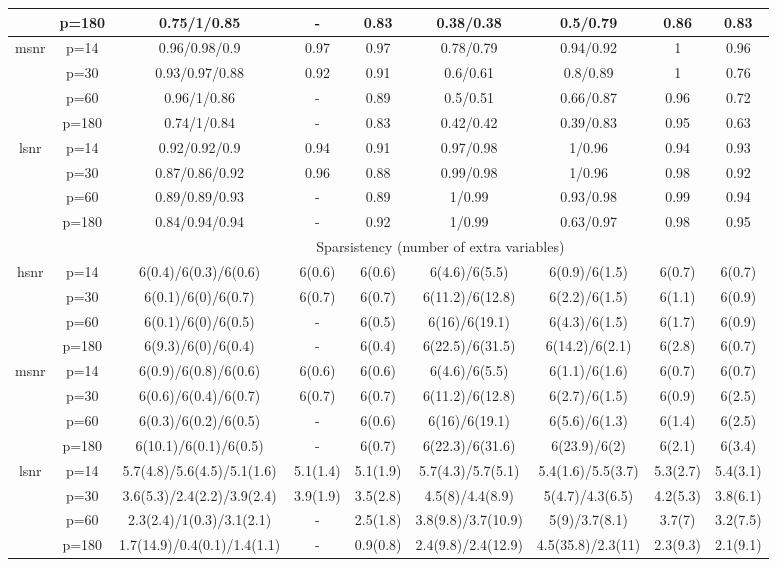 \begin{table}[ht]
{\begin{tabular}{|c|c|ccccccc|}
   & p=180 & 0.75/1/0.85 & - & 0.83 & 0.38/0.38 & 0.5/0.79 & 0.86 & 0.83 \\ 
  \midrule\multirow{4}[2]{*}{msnr} & p=14 & 0.96/0.98/0.9 & 0.97 & 0.97 & 0.78/0.79 & 0.94/0.92 & 1 & 0.96 \\ 
   & p=30 & 0.93/0.97/0.88 & 0.92 & 0.91 & 0.6/0.61 & 0.8/0.89 & 1 & 0.76 \\ 
   & p=60 & 0.96/1/0.86 & - & 0.89 & 0.5/0.51 & 0.66/0.87 & 0.96 & 0.72 \\ 
   & p=180 & 0.74/1/0.84 & - & 0.83 & 0.42/0.42 & 0.39/0.83 & 0.95 & 0.63 \\ 
  \midrule\multirow{4}[2]{*}{lsnr} & p=14 & 0.92/0.92/0.9 & 0.94 & 0.91 & 0.97/0.98 & 1/0.96 & 0.94 & 0.93 \\ 
   & p=30 & 0.87/0.86/0.92 & 0.96 & 0.88 & 0.99/0.98 & 1/0.96 & 0.98 & 0.92 \\ 
   & p=60 & 0.89/0.89/0.93 & - & 0.89 & 1/0.99 & 0.93/0.98 & 0.99 & 0.94 \\ 
   & p=180 & 0.84/0.94/0.94 & - & 0.92 & 1/0.99 & 0.63/0.97 & 0.98 & 0.95 \\ 
   \midrule 
 \multicolumn{1}{|c}{} &       & \multicolumn{7}{c|}{Sparsistency (number of extra variables)} \\
\midrule\multirow{4}[2]{*}{hsnr} & p=14 & 6(0.4)/6(0.3)/6(0.6) & 6(0.6) & 6(0.6) & 6(4.6)/6(5.5) & 6(0.9)/6(1.5) & 6(0.7) & 6(0.7) \\ 
   & p=30 & 6(0.1)/6(0)/6(0.7) & 6(0.7) & 6(0.7) & 6(11.2)/6(12.8) & 6(2.2)/6(1.5) & 6(1.1) & 6(0.9) \\ 
   & p=60 & 6(0.1)/6(0)/6(0.5) & - & 6(0.5) & 6(16)/6(19.1) & 6(4.3)/6(1.5) & 6(1.7) & 6(0.9) \\ 
   & p=180 & 6(9.3)/6(0)/6(0.4) & - & 6(0.4) & 6(22.5)/6(31.5) & 6(14.2)/6(2.1) & 6(2.8) & 6(0.7) \\ 
  \midrule\multirow{4}[2]{*}{msnr} & p=14 & 6(0.9)/6(0.8)/6(0.6) & 6(0.6) & 6(0.6) & 6(4.6)/6(5.5) & 6(1.1)/6(1.6) & 6(0.7) & 6(0.7) \\ 
   & p=30 & 6(0.6)/6(0.4)/6(0.7) & 6(0.7) & 6(0.7) & 6(11.2)/6(12.8) & 6(2.7)/6(1.5) & 6(0.9) & 6(2.5) \\ 
   & p=60 & 6(0.3)/6(0.2)/6(0.5) & - & 6(0.6) & 6(16)/6(19.1) & 6(5.6)/6(1.3) & 6(1.4) & 6(2.5) \\ 
   & p=180 & 6(10.1)/6(0.1)/6(0.5) & - & 6(0.7) & 6(22.3)/6(31.6) & 6(23.9)/6(2) & 6(2.1) & 6(3.4) \\ 
  \midrule\multirow{4}[2]{*}{lsnr} & p=14 & 5.7(4.8)/5.6(4.5)/5.1(1.6) & 5.1(1.4) & 5.1(1.9) & 5.7(4.3)/5.7(5.1) & 5.4(1.6)/5.5(3.7) & 5.3(2.7) & 5.4(3.1) \\ 
   & p=30 & 3.6(5.3)/2.4(2.2)/3.9(2.4) & 3.9(1.9) & 3.5(2.8) & 4.5(8)/4.4(8.9) & 5(4.7)/4.3(6.5) & 4.2(5.3) & 3.8(6.1) \\ 
   & p=60 & 2.3(2.4)/1(0.3)/3.1(2.1) & - & 2.5(1.8) & 3.8(9.8)/3.7(10.9) & 5(9)/3.7(8.1) & 3.7(7) & 3.2(7.5) \\ 
   & p=180 & 1.7(14.9)/0.4(0.1)/1.4(1.1) & - & 0.9(0.8) & 2.4(9.8)/2.4(12.9) & 4.5(35.8)/2.3(11) & 2.3(9.3) & 2.1(9.1) \\ 
   \bottomrule 
\end{tabular}
}
\end{table}
